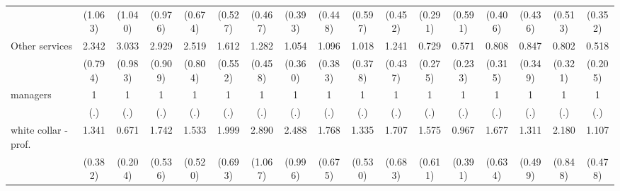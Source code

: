 {\begin{tabular}{l*{16}{c}}
                    &     (1.063)         &     (1.040)         &     (0.976)         &     (0.674)         &     (0.527)         &     (0.467)         &     (0.393)         &     (0.448)         &     (0.597)         &     (0.452)         &     (0.291)         &     (0.591)         &     (0.406)         &     (0.436)         &     (0.513)         &     (0.352)         \\
[1em]
Other services      &       2.342\sym{*}  &       3.033\sym{***}&       2.929\sym{***}&       2.519\sym{**} &       1.612         &       1.282         &       1.054         &       1.096         &       1.018         &       1.241         &       0.729         &       0.571         &       0.808         &       0.847         &       0.802         &       0.518         \\
                    &     (0.794)         &     (0.983)         &     (0.909)         &     (0.804)         &     (0.552)         &     (0.458)         &     (0.360)         &     (0.383)         &     (0.378)         &     (0.437)         &     (0.275)         &     (0.233)         &     (0.315)         &     (0.349)         &     (0.321)         &     (0.205)         \\
[1em]
managers            &           1         &           1         &           1         &           1         &           1         &           1         &           1         &           1         &           1         &           1         &           1         &           1         &           1         &           1         &           1         &           1         \\
                    &         (.)         &         (.)         &         (.)         &         (.)         &         (.)         &         (.)         &         (.)         &         (.)         &         (.)         &         (.)         &         (.)         &         (.)         &         (.)         &         (.)         &         (.)         &         (.)         \\
[1em]
white collar - prof.&       1.341         &       0.671         &       1.742         &       1.533         &       1.999\sym{*}  &       2.890\sym{**} &       2.488\sym{*}  &       1.768         &       1.335         &       1.707         &       1.575         &       0.967         &       1.677         &       1.311         &       2.180\sym{*}  &       1.107         \\
                    &     (0.382)         &     (0.204)         &     (0.536)         &     (0.520)         &     (0.693)         &     (1.067)         &     (0.996)         &     (0.675)         &     (0.530)         &     (0.683)         &     (0.611)         &     (0.391)         &     (0.634)         &     (0.499)         &     (0.848)         &     (0.478)         \\

\end{tabular}}
